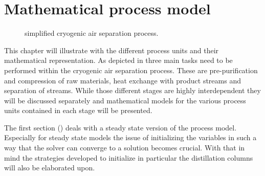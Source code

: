 \chapter{Mathematical process model}
\label{sec:mathprocess}
    \begin{figure}
        
        \caption{simplified cryogenic air separation process.}
        \label{fig:asu_simple}
    \end{figure}

%


    This chapter will illustrate with the different process units and their mathematical representation.
    As depicted in  three main tasks need to be performed within the cryogenic air separation process.
    These are pre-purification and compression of raw materials, heat exchange with product streams and separation of streams.
    While those different stages are highly interdependent they will be discussed separately and mathematical
    models for the various process units contained in each stage will be presented.

    The first section () deals with a steady state version of the process model. Especially
    for steady state models the issue of initializing the variables in such a way that the solver can converge to a solution
    becomes crucial. With that in mind the strategies developed to initialize in particular the distillation columns will also
    be elaborated upon.

